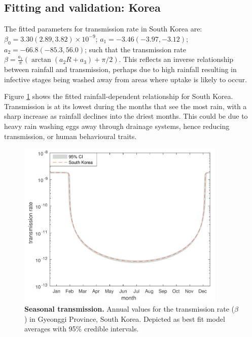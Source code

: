 \subsection{Fitting and validation: Korea}

The fitted parameters for transmission rate in South Korea are: $\beta_0 = 3.30 (2.89,3.82)\times10^{-9}$; $a_1 = -3.46(-3.97,-3.12)$; $a_2 = -66.8(-85.3,56.0)$; such that the transmission rate $\beta= \frac{a_1}{\pi}(\arctan(a_2R+a_3)+\pi/2)$.  This reflects an inverse relationship between rainfall and transmission, perhaps due to high rainfall resulting in infective stages being washed away from areas where uptake is likely to occur.

Figure \ref{Fig7} shows the fitted rainfall-dependent relationship for South Korea. Transmission is at its lowest during the months that see the most rain, with a sharp increase as rainfall declines into the driest months. This could be due to heavy rain washing eggs away through drainage systems, hence reducing transmission, or human behavioural traits.

\begin{figure}[!ht]
\begin{center}
\includegraphics[height=8cm]{Project/Figures/STH/Fig7.pdf}
\caption[Seasonal transmission (South Korea).]{{\bf Seasonal transmission.}
Annual values for the transmission rate ($\beta$) in Gyeonggi Province, South Korea. Depicted as best fit model averages with 95\% credible intervals.}
\label{Fig7}
\end{center}
\end{figure} 


